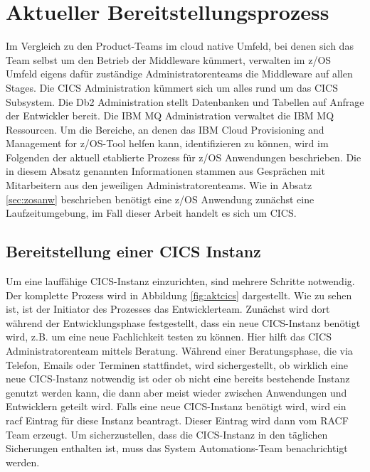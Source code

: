\section{Aktueller Bereitstellungsprozess}\label{sec:aktbereit}
Im Vergleich zu den Product-Teams im cloud native Umfeld, bei denen sich das Team selbst um den Betrieb der Middleware kümmert, verwalten im z/OS Umfeld eigens dafür zuständige Administratorenteams die Middleware auf allen Stages.
Die \glqq CICS Administration\grqq{} kümmert sich um alles rund um das CICS Subsystem.
Die \glqq Db2 Administration\grqq{} stellt Datenbanken und Tabellen auf Anfrage der Entwickler bereit.
Die \glqq IBM MQ Administration\grqq{} verwaltet die IBM MQ Ressourcen.
Um die Bereiche, an denen das \glqq IBM Cloud Provisioning and Management for z/OS\grqq-Tool helfen kann, identifizieren zu können, wird im Folgenden der aktuell etablierte Prozess für z/OS Anwendungen beschrieben.
Die in diesem Absatz genannten Informationen stammen aus Gesprächen mit Mitarbeitern aus den jeweiligen Administratorenteams.
Wie in Absatz \ref{sec:zosanw} beschrieben benötigt eine z/OS Anwendung zunächst eine Laufzeitumgebung, im Fall dieser Arbeit handelt es sich um CICS.

\subsection{Bereitstellung einer CICS Instanz}\label{ssec:aktcics}
Um eine lauffähige CICS-Instanz einzurichten, sind mehrere Schritte notwendig.
Der komplette Prozess wird in Abbildung \ref{fig:aktcics} dargestellt.
Wie zu sehen ist, ist der Initiator des Prozesses das Entwicklerteam.
Zunächst wird dort während der Entwicklungsphase festgestellt, dass ein neue CICS-Instanz benötigt wird, z.B. um eine neue Fachlichkeit testen zu können. 
Hier hilft das CICS Administratorenteam mittels Beratung.
Während einer Beratungsphase, die via Telefon, Emails oder Terminen stattfindet, wird sichergestellt, ob wirklich eine neue CICS-Instanz notwendig ist oder ob nicht eine bereits bestehende Instanz genutzt werden kann, die dann aber meist wieder zwischen Anwendungen und Entwicklern geteilt wird.
Falls eine neue CICS-Instanz benötigt wird, wird ein \Gls{racf} Eintrag für diese Instanz beantragt.
Dieser Eintrag wird dann vom RACF Team erzeugt.
Um sicherzustellen, dass die CICS-Instanz in den täglichen Sicherungen enthalten ist, muss das System Automations-Team benachrichtigt werden.

